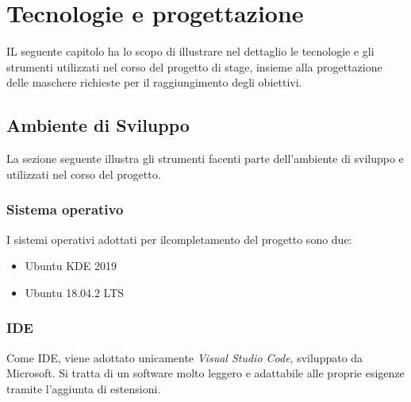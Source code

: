 
\chapter{Tecnologie e progettazione}
\label{cap:tecnologie-progettazione}
IL seguente capitolo ha lo scopo di illustrare nel dettaglio le tecnologie e gli strumenti utilizzati nel corso del progetto di stage, insieme alla progettazione delle maschere richieste per il raggiungimento degli obiettivi. 

\section{Ambiente di Sviluppo}
La sezione seguente illustra gli strumenti facenti parte dell'ambiente di sviluppo e utilizzati nel corso del progetto.

\subsection{Sistema operativo}
I sistemi operativi adottati per ilcompletamento del progetto sono due:
\begin{itemize}
	\item Ubuntu KDE 2019
	\item Ubuntu 18.04.2 LTS
\end{itemize}

\subsection{IDE}
Come \gls{IDE}, viene adottato unicamente \textit{Visual Studio Code}, sviluppato da Microsoft. Si tratta di un software molto leggero e adattabile alle proprie esigenze tramite l'aggiunta di estensioni.
